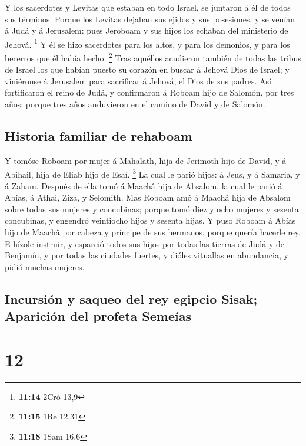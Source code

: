  Y los sacerdotes y Levitas que estaban en todo Israel, se
juntaron á él de todos sus términos.  Porque los Levitas
dejaban sus ejidos y sus posesiones, y se venían á Judá y á Jerusalem:
pues Jeroboam y sus hijos los echaban del ministerio de Jehová.
\footnote{\textbf{11:14} 2Cró 13,9}  Y él se hizo
sacerdotes para los altos, y para los demonios, y para los becerros que
él había hecho. \footnote{\textbf{11:15} 1Re 12,31}  Tras
aquéllos acudieron también de todas las tribus de Israel los que habían
puesto su corazón en buscar á Jehová Dios de Israel; y viniéronse á
Jerusalem para sacrificar á Jehová, el Dios de sus padres. 
Así fortificaron el reino de Judá, y confirmaron á Roboam hijo de
Salomón, por tres años; porque tres años anduvieron en el camino de
David y de Salomón.

\hypertarget{historia-familiar-de-rehaboam}{%
\subsection{Historia familiar de
rehaboam}\label{historia-familiar-de-rehaboam}}

 Y tomóse Roboam por mujer á Mahalath, hija de Jerimoth
hijo de David, y á Abihail, hija de Eliab hijo de Esaí. \footnote{\textbf{11:18}
  1Sam 16,6}  La cual le parió hijos: á Jeus, y á Samaria,
y á Zaham.  Después de ella tomó á Maachâ hija de Absalom,
la cual le parió á Abías, á Athai, Ziza, y Selomith.  Mas
Roboam amó á Maachâ hija de Absalom sobre todas sus mujeres y
concubinas; porque tomó diez y ocho mujeres y sesenta concubinas, y
engendró veintiocho hijos y sesenta hijas.  Y puso Roboam á
Abías hijo de Maachâ por cabeza y príncipe de sus hermanos, porque
quería hacerle rey.  E hízole instruir, y esparció todos
sus hijos por todas las tierras de Judá y de Benjamín, y por todas las
ciudades fuertes, y dióles vituallas en abundancia, y pidió muchas
mujeres.

\hypertarget{incursiuxf3n-y-saqueo-del-rey-egipcio-sisak-apariciuxf3n-del-profeta-semeuxedas}{%
\subsection{Incursión y saqueo del rey egipcio Sisak; Aparición del
profeta
Semeías}\label{incursiuxf3n-y-saqueo-del-rey-egipcio-sisak-apariciuxf3n-del-profeta-semeuxedas}}

\hypertarget{section-11}{%
\section{12}\label{section-11}}

